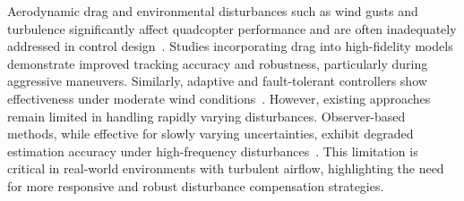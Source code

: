\noindent Aerodynamic drag and environmental disturbances such as wind gusts and turbulence significantly affect quadcopter performance and are often inadequately addressed in control design~\cite{wang2023robust,samy2024robust}. Studies incorporating drag into high-fidelity models demonstrate improved tracking accuracy and robustness, particularly during aggressive maneuvers. Similarly, adaptive and fault-tolerant controllers show effectiveness under moderate wind conditions~\cite{aghazamani2024fault}. However, existing approaches remain limited in handling rapidly varying disturbances. Observer-based methods, while effective for slowly varying uncertainties, exhibit degraded estimation accuracy under high-frequency disturbances~\cite{pan2021robust}. This limitation is critical in real-world environments with turbulent airflow, highlighting the need for more responsive and robust disturbance compensation strategies.






